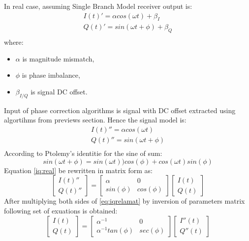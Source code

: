 \documentclass[en,printmode]{mgr}
\begin{document}
	    In real case, assuming Single Branch Model receiver output is:
		\begin{equation}
			\renewcommand*{\arraystretch}{1.3} 
			\begin{array}{ll}
				I(t)' = \alpha cos(\omega t) + \beta_I \\
				Q(t)' = sin(\omega t + \phi) + \beta_Q \\
			\end{array}
		\end{equation}
		where:
		\begin{itemize}
			\item $\alpha$ is magnitude mismatch,
			\item $\phi$ is phase imbalance,
			\item $\beta_{I/Q}$ is signal DC offset.
		\end{itemize}
		Input of phase correction algorithms is signal with DC offset extracted using algortihms
		from previews section. Hence the signal model is:
		\begin{equation}
			\renewcommand*{\arraystretch}{1.3} 
			\begin{array}{ll}
				I(t)'' = \alpha cos(\omega t) \\
				Q(t)'' = sin(\omega t + \phi) \\
			\end{array} \label{eq:iqreal}
		\end{equation}
		According to Ptolemy’s identitie for the sine of sum:
		\[
			sin\left(\omega t + \phi\right) = 
			sin\left(\omega t\right))cos\left(\phi \right) + 
			cos\left(\omega t\right) sin\left(\phi \right)
		\] 
		Equation \ref{iq:real} be rewritten in matrix form as:
		\begin{equation}
			\begin{bmatrix}
				I(t)'' \\
				Q(t)''
			\end{bmatrix}
			=
			\begin{bmatrix}
				\alpha & 0 \\
				sin(\phi) & cos(\phi)
			\end{bmatrix}
			\begin{bmatrix}
				I(t) \\
				Q(t)
			\end{bmatrix} \label{eq:iqrealmat}
		\end{equation}
		After multiplying both sides of \ref{eq:iqrelamat} by inversion of parameters matrix following set of exuations
		is obtained:
		\begin{equation}
			\begin{bmatrix}
				I(t) \\
				Q(t)
			\end{bmatrix}
			=
			\begin{bmatrix}
				\alpha^{-1} & 0 \\
				\alpha^{-1}tan(\phi) & sec(\phi)
			\end{bmatrix}
			\begin{bmatrix}
				I''(t) \\
				Q''(t)
			\end{bmatrix}
		\end{equation}
\end{document}
